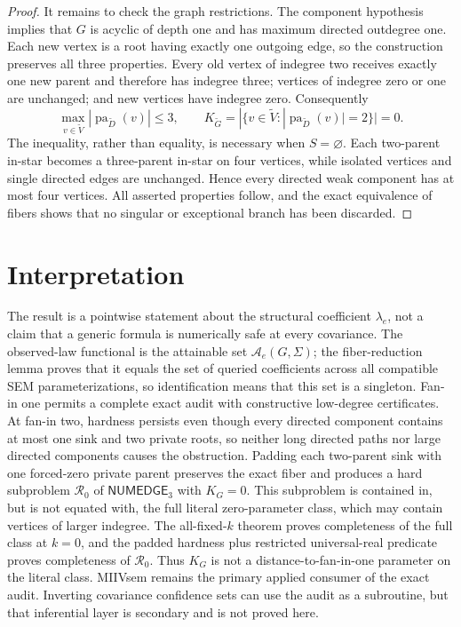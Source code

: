 \documentclass{article}
\begin{document}
\begin{proof}
It remains to check the graph restrictions. The component hypothesis implies that \(G\) is acyclic of depth one and has maximum directed outdegree one. Each new vertex is a root having exactly one outgoing edge, so the construction preserves all three properties. Every old vertex of indegree two receives exactly one new parent and therefore has indegree three; vertices of indegree zero or one are unchanged; and new vertices have indegree zero. Consequently
\[
\max_{v\in\widetilde V}|\operatorname{pa}_{\widetilde D}(v)|\le3,
\qquad
K_{\widetilde G}
=|\{v\in\widetilde V:|\operatorname{pa}_{\widetilde D}(v)|=2\}|=0.
\]
The inequality, rather than equality, is necessary when \(S=\varnothing\). Each two-parent in-star becomes a three-parent in-star on four vertices, while isolated vertices and single directed edges are unchanged. Hence every directed weak component has at most four vertices. All asserted properties follow, and the exact equivalence of fibers shows that no singular or exceptional branch has been discarded.
\end{proof}

\section{Interpretation}

The result is a pointwise statement about the structural coefficient \(\lambda_e\), not a claim that a generic formula is numerically safe at every covariance. The observed-law functional is the attainable set \(\mathcal A_e(G,\Sigma)\); the fiber-reduction lemma proves that it equals the set of queried coefficients across all compatible SEM parameterizations, so identification means that this set is a singleton. Fan-in one permits a complete exact audit with constructive low-degree certificates. At fan-in two, hardness persists even though every directed component contains at most one sink and two private roots, so neither long directed paths nor large directed components causes the obstruction. Padding each two-parent sink with one forced-zero private parent preserves the exact fiber and produces a hard subproblem \(\mathcal R_0\) of \(\mathsf{NUMEDGE}_3\) with \(K_G=0\). This subproblem is contained in, but is not equated with, the full literal zero-parameter class, which may contain vertices of larger indegree. The all-fixed-\(k\) theorem proves completeness of the full class at \(k=0\), and the padded hardness plus restricted universal-real predicate proves completeness of \(\mathcal R_0\). Thus \(K_G\) is not a distance-to-fan-in-one parameter on the literal class. MIIVsem remains the primary applied consumer of the exact audit. Inverting covariance confidence sets can use the audit as a subroutine, but that inferential layer is secondary and is not proved here.
\end{document}
